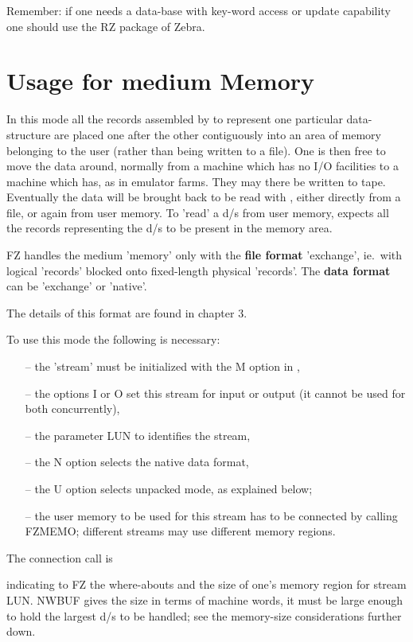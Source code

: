 {Remember: if one needs a data-base with key-word access
or update capability one should use the RZ package of Zebra.

\section{Usage for medium Memory}

In this mode all the records assembled by  to represent
one particular data-structure are placed one after the other
contiguously into an area of memory belonging to the user
(rather than being written to a file).
One is then free to move the data around,
normally from a machine which has no I/O facilities
to a machine which has, as in emulator farms.
They may there be written to tape.
Eventually the data will be brought back to be read with ,
either directly from a file, or again from user memory.
To 'read' a d/s from user memory,
 expects all the records representing the d/s
to be present in the memory area.

FZ handles the medium 'memory' only with the
\textbf{file format} 'exchange',
ie.~with logical 'records' blocked onto fixed-length physical
'records'.
The \textbf{data format} can be 'exchange' or 'native'.

The details of this format are found in chapter 3.

To use this mode the following is necessary:
\begin{itemize}
 \item[--]  the 'stream' must be initialized with the M option in ,
 \item[--]  the options I or O set this stream for input or output
               (it cannot be used for both concurrently),
 \item[--]   the parameter LUN to  identifies the stream,
 \item[--]   the N option selects the native data format,
 \item[--]   the U option selects unpacked mode, as explained below;
 \item[--]  the user memory to be used for this stream
has to be connected by calling FZMEMO;
different streams may use different memory regions.
\end{itemize}

The connection call is


indicating to FZ the where-abouts and the size of one's
memory region for stream LUN.
NWBUF gives the size in terms of machine words,
it must be large enough to hold the largest d/s to be handled;
see the memory-size considerations further down.

}
